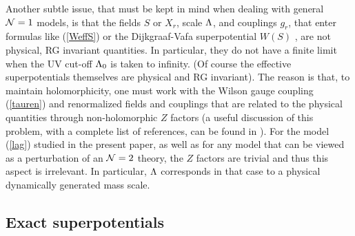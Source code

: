 \documentclass[a4paper,12pt]{article}
\begin{document}
Another subtle issue, that must be kept in mind when dealing with
general ${\cal N}=1$ models, is that the fields $S$ or $X_{r}$, scale
$\Lambda$, and couplings $g_{r}$, that enter formulas like (\ref{WeffS}) or
the Dijkgraaf-Vafa superpotential $W(S)$ \cite{DV}, are not physical,
RG invariant quantities. In particular, they do not have a finite limit
when the UV cut-off $\Lambda_{0}$ is taken to infinity. (Of course the
effective superpotentials themselves are physical and RG invariant).
The reason is that, to maintain holomorphicity, one must work with the
Wilson gauge coupling (\ref{tauren}) and renormalized fields and
couplings that are related to the physical quantities through
non-holomorphic $Z$ factors (a useful discussion of this problem, with
a complete list of references, can be found in \cite{RR}). 
For the model (\ref{lag}) studied in the present paper,
as well as for any model that can be viewed as a
perturbation of an ${\cal N}=2$ theory, the $Z$ factors are trivial
and thus this aspect is irrelevant. In particular, $\Lambda$ 
corresponds in that case to a physical dynamically generated mass scale.

%
\subsection{Exact superpotentials}
%
\end{document}
